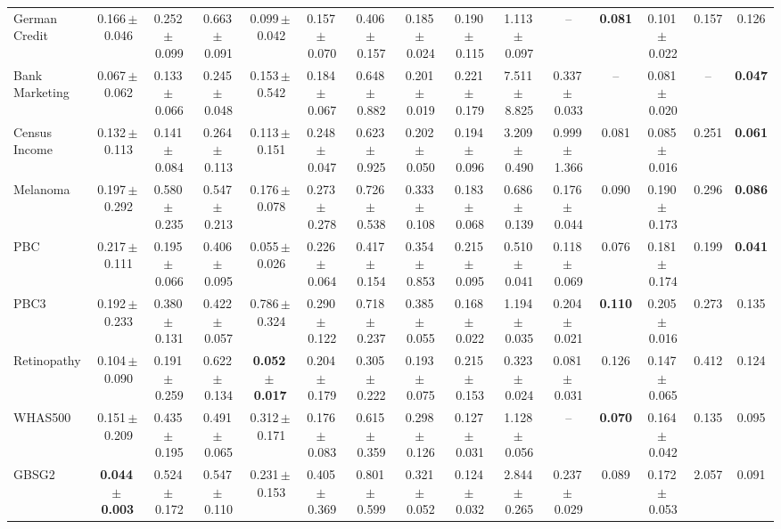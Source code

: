 \documentclass[8pt]{extarticle}
\begin{document}
\begin{longtable}{l*{14}{c}}
German Credit & 0.166\,$\pm$\,0.046 & 0.252\,$\pm$\,0.099 & 0.663\,$\pm$\,0.091 & 0.099\,$\pm$\,0.042 & 0.157\,$\pm$\,0.070 & 0.406\,$\pm$\,0.157 & 0.185\,$\pm$\,0.024 & 0.190\,$\pm$\,0.115 & 1.113\,$\pm$\,0.097 & -- & \textbf{0.081} & 0.101\,$\pm$\,0.022 & 0.157 & 0.126 \\
Bank Marketing & 0.067\,$\pm$\,0.062 & 0.133\,$\pm$\,0.066 & 0.245\,$\pm$\,0.048 & 0.153\,$\pm$\,0.542 & 0.184\,$\pm$\,0.067 & 0.648\,$\pm$\,0.882 & 0.201\,$\pm$\,0.019 & 0.221\,$\pm$\,0.179 & 7.511\,$\pm$\,8.825 & 0.337\,$\pm$\,0.033 & -- & 0.081\,$\pm$\,0.020 & -- & \textbf{0.047} \\
Census Income & 0.132\,$\pm$\,0.113 & 0.141\,$\pm$\,0.084 & 0.264\,$\pm$\,0.113 & 0.113\,$\pm$\,0.151 & 0.248\,$\pm$\,0.047 & 0.623\,$\pm$\,0.925 & 0.202\,$\pm$\,0.050 & 0.194\,$\pm$\,0.096 & 3.209\,$\pm$\,0.490 & 0.999\,$\pm$\,1.366 & 0.081 & 0.085\,$\pm$\,0.016 & 0.251 & \textbf{0.061} \\
Melanoma & 0.197\,$\pm$\,0.292 & 0.580\,$\pm$\,0.235 & 0.547\,$\pm$\,0.213 & 0.176\,$\pm$\,0.078 & 0.273\,$\pm$\,0.278 & 0.726\,$\pm$\,0.538 & 0.333\,$\pm$\,0.108 & 0.183\,$\pm$\,0.068 & 0.686\,$\pm$\,0.139 & 0.176\,$\pm$\,0.044 & 0.090 & 0.190\,$\pm$\,0.173 & 0.296 & \textbf{0.086} \\
PBC & 0.217\,$\pm$\,0.111 & 0.195\,$\pm$\,0.066 & 0.406\,$\pm$\,0.095 & 0.055\,$\pm$\,0.026 & 0.226\,$\pm$\,0.064 & 0.417\,$\pm$\,0.154 & 0.354\,$\pm$\,0.853 & 0.215\,$\pm$\,0.095 & 0.510\,$\pm$\,0.041 & 0.118\,$\pm$\,0.069 & 0.076 & 0.181\,$\pm$\,0.174 & 0.199 & \textbf{0.041} \\
PBC3 & 0.192\,$\pm$\,0.233 & 0.380\,$\pm$\,0.131 & 0.422\,$\pm$\,0.057 & 0.786\,$\pm$\,0.324 & 0.290\,$\pm$\,0.122 & 0.718\,$\pm$\,0.237 & 0.385\,$\pm$\,0.055 & 0.168\,$\pm$\,0.022 & 1.194\,$\pm$\,0.035 & 0.204\,$\pm$\,0.021 & \textbf{0.110} & 0.205\,$\pm$\,0.016 & 0.273 & 0.135 \\
Retinopathy & 0.104\,$\pm$\,0.090 & 0.191\,$\pm$\,0.259 & 0.622\,$\pm$\,0.134 & \textbf{0.052\,$\pm$\,0.017} & 0.204\,$\pm$\,0.179 & 0.305\,$\pm$\,0.222 & 0.193\,$\pm$\,0.075 & 0.215\,$\pm$\,0.153 & 0.323\,$\pm$\,0.024 & 0.081\,$\pm$\,0.031 & 0.126 & 0.147\,$\pm$\,0.065 & 0.412 & 0.124 \\
WHAS500 & 0.151\,$\pm$\,0.209 & 0.435\,$\pm$\,0.195 & 0.491\,$\pm$\,0.065 & 0.312\,$\pm$\,0.171 & 0.176\,$\pm$\,0.083 & 0.615\,$\pm$\,0.359 & 0.298\,$\pm$\,0.126 & 0.127\,$\pm$\,0.031 & 1.128\,$\pm$\,0.056 & -- & \textbf{0.070} & 0.164\,$\pm$\,0.042 & 0.135 & 0.095 \\
GBSG2 & \textbf{0.044\,$\pm$\,0.003} & 0.524\,$\pm$\,0.172 & 0.547\,$\pm$\,0.110 & 0.231\,$\pm$\,0.153 & 0.405\,$\pm$\,0.369 & 0.801\,$\pm$\,0.599 & 0.321\,$\pm$\,0.052 & 0.124\,$\pm$\,0.032 & 2.844\,$\pm$\,0.265 & 0.237\,$\pm$\,0.029 & 0.089 & 0.172\,$\pm$\,0.053 & 2.057 & 0.091 \\

\end{longtable}
\end{document}

